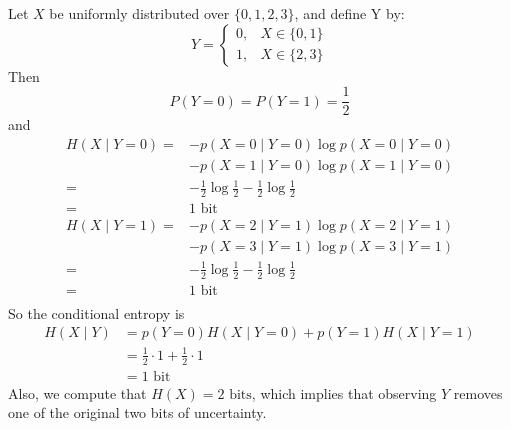 \documentclass[11pt]{report}
\theoremstyle{lecturedefinition}
\theoremstyle{lectureremark}
\begin{document}
\begin{ExampleBox}
Let $X$ be uniformly distributed over $\{0,1,2,3\}$, and define Y by:
\begin{equation*}
    Y=\begin{cases}
        0,& X\in\{0,1\}\\
        1,& X\in\{2,3\}
    \end{cases}
\end{equation*}
Then 
\begin{equation*}
P(Y=0)=P(Y=1)=\frac{1}{2}
\end{equation*}
and
\begin{equation*}
    \begin{aligned}
        H(X\mid Y=0)=&-p(X=0\mid Y=0)\log p(X=0\mid Y=0)\\
        &-p(X=1\mid Y=0)\log p(X=1\mid Y=0)\\
        =&-\frac{1}{2}\log\frac{1}{2}-\frac{1}{2}\log \frac{1}{2}\\
        =&1\text{ bit}\\
        H(X\mid Y=1)=&-p(X=2\mid Y=1)\log p(X=2\mid Y=1)\\
        &-p(X=3\mid Y=1)\log p(X=3\mid Y=1)\\
        =&-\frac{1}{2}\log\frac{1}{2}-\frac{1}{2}\log \frac{1}{2}\\
        =&1\text{ bit}\\
    \end{aligned}
\end{equation*}
So the conditional entropy is
\begin{equation*}
    \begin{aligned}
        H(X\mid Y)&=p(Y=0)H(X\mid Y=0)+p(Y=1)H(X\mid Y=1)\\
        &=\frac{1}{2}\cdot 1+\frac{1}{2}\cdot 1\\
        &= 1\text{ bit}
    \end{aligned}
\end{equation*}
Also, we compute that $H(X)=2\text{ bits}$, which implies that observing $Y$ removes one of the original two bits of uncertainty.
\end{ExampleBox}
\end{document}
